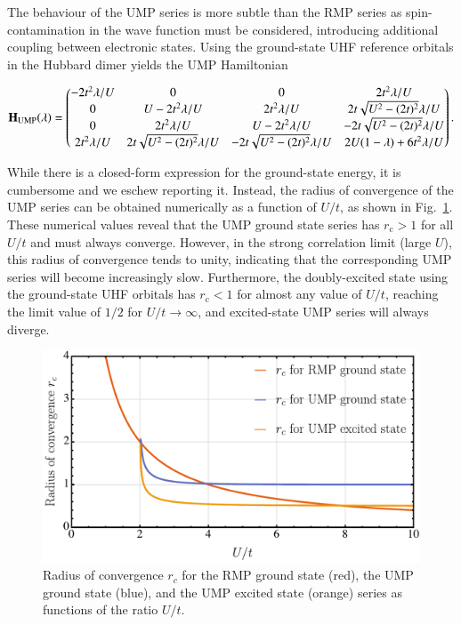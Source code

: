 \documentclass[aps,prb,reprint,noshowkeys,linenumbers,superscriptaddress]{revtex4-1}
\newcommand{\bH}{\mathbf{H}}
\newcommand{\rc}{r_{\text{c}}}
\begin{document}
The behaviour of the UMP series is more subtle than the RMP series as spin-contamination in the wave function
must be considered, introducing additional coupling between electronic states.
Using the ground-state UHF reference orbitals in the Hubbard dimer yields the UMP Hamiltonian
\begin{widetext}
\begin{equation}
\label{eq:H_UMP}
\bH_\text{UMP}\qty(\lambda) = 
	\begin{pmatrix}
		-2t^2 \lambda/U	&	0									&	0									&	2t^2 \lambda/U		\\
		0				&	U - 2t^2 \lambda/U 					&	2t^2\lambda/U						&	2t \sqrt{U^2 - (2t)^2} \lambda/U	\\
		0				&	2t^2\lambda/U						&	U - 2t^2 \lambda/U 					&	-2t \sqrt{U^2 - (2t)^2} \lambda/U	\\
		2t^2 \lambda/U	&	2t \sqrt{U^2 - (2t)^2} \lambda/U 	&	-2t \sqrt{U^2 - (2t)^2} \lambda/U	&	2U(1-\lambda) + 6t^2\lambda/U		\\
	\end{pmatrix}.
\end{equation}
\end{widetext}
While there is a closed-form expression for the ground-state energy, it is cumbersome and we eschew reporting it.
Instead, the radius of convergence of the UMP series can be obtained numerically as a function of $U/t$, as shown
in Fig.~\ref{fig:RadConv}.
These numerical values reveal that the UMP ground state series has $\rc > 1$ for all $U/t$ and must always converge.
However, in the strong correlation limit (large $U$), this radius of convergence tends to unity, indicating that
the corresponding UMP series will become increasingly slow.
Furthermore, the doubly-excited state using the ground-state UHF orbitals has $\rc < 1$ for almost any value 
of $U/t$, reaching the limit value of $1/2$ for $U/t \rightarrow \infty$, and excited-state UMP series will always diverge.
 
\begin{figure}
	\includegraphics[width=\linewidth]{RadConv}
	\caption{
	Radius of convergence $r_c$ for the RMP ground state (red), the UMP ground state (blue), and the UMP excited state (orange) 
    series as functions of the ratio $U/t$.
	\label{fig:RadConv}}
\end{figure}
 
\end{document}
